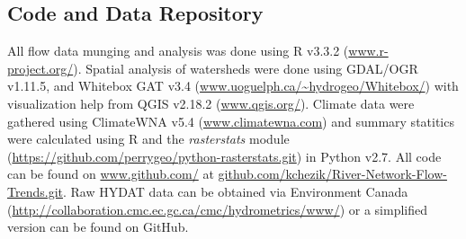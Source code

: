 \documentclass[9pt,twocolumn,twoside,lineno]{pnas-new}
\begin{document}
{\subsection*{Code and Data Repository} All flow data munging and analysis was done using R v3.3.2 (\url{www.r-project.org/}). Spatial analysis of watersheds were done using GDAL/OGR v1.11.5, and Whitebox GAT v3.4 (\url{www.uoguelph.ca/~hydrogeo/Whitebox/}) with visualization help from QGIS v2.18.2 (\url{www.qgis.org/}). Climate data were gathered using ClimateWNA v5.4 (\url{www.climatewna.com}) and summary statitics were calculated using R and the \textit{rasterstats} module (\url{https://github.com/perrygeo/python-rasterstats.git}) in Python v2.7. All code can be found on \url{www.github.com/} at \url{github.com/kchezik/River-Network-Flow-Trends.git}. Raw HYDAT data can be obtained via Environment Canada (\url{http://collaboration.cmc.ec.gc.ca/cmc/hydrometrics/www/}) or a simplified version can be found on GitHub.
}

\showmatmethods{} %


\showacknow{} %

\pnasbreak


\end{document}
